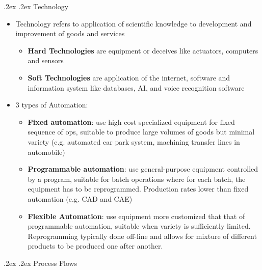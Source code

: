 \documentclass[10pt,landscape,a4paper]{article}
\makeatletter
\renewcommand{\section}{\@startsection{section}{1}{0mm}%
	{.2ex}%
	{.2ex}%
	{\color{myblue}\sffamily\small\bfseries}}
\renewcommand{\subsection}{\@startsection{subsection}{1}{0mm}%
	{.2ex}%
	{.2ex}%
	{\sffamily\bfseries}}
\makeatother
\begin{document}
\begin{multicols*}{4}
		\subsection{Technology}
		\begin{itemize}
			\item Technology refers to application of scientific knowledge to development and improvement of goods and services
			\begin{itemize}
				\item \textbf{Hard Technologies} are equipment or deceives like actuators, computers and sensors
				\item \textbf{Soft Technologies} are application of the internet, software and information system like databases, AI, and voice recognition software
			\end{itemize}
			\item 3 types of Automation:
			\begin{itemize}
				\item \textbf{Fixed automation}: use high cost specialized equipment for fixed sequence of ops, suitable to produce large volumes of goods but minimal variety (e.g. automated car park system, machining transfer lines in automobile)
				\item \textbf{Programmable automation}: use general-purpose equipment controlled by a program, suitable for batch operations where for each batch, the equipment has to be reprogrammed. Production rates lower than fixed automation (e.g. CAD and CAE)
				\item \textbf{Flexible Automation}: use equipment more customized that that of programmable automation, suitable when variety is sufficiently limited. Reprogramming typically done off-line and allows for mixture of different products to be produced one after another.
			\end{itemize}
		\end{itemize}
		\section{Process Flows}

\end{multicols*}
\end{document}
